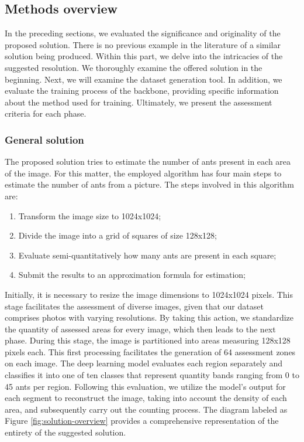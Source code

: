\subsection{{Methods overview}}

In the preceding sections, we evaluated the significance and originality of the proposed solution. There is no previous example in the literature of a similar solution being produced. Within this part, we delve into the intricacies of the suggested resolution. We thoroughly examine the offered solution in the beginning. Next, we will examine the dataset generation tool. In addition, we evaluate the training process of the backbone, providing specific information about the method used for training. Ultimately, we present the assessment criteria for each phase.

\subsubsection{General solution}

The proposed solution tries to estimate the number of ants present in each area of the image. For this matter, the employed algorithm has four main steps to estimate the number of ants from a picture. The steps involved in this algorithm are:

\begin{enumerate}
    \item Transform the image size to 1024x1024;
    \item Divide the image into a grid of squares of size 128x128;
    \item Evaluate semi-quantitatively how many ants are present in each square;
    \item Submit the results to an approximation formula for estimation;
\end{enumerate}

Initially, it is necessary to resize the image dimensions to 1024x1024 pixels. This stage facilitates the assessment of diverse images, given that our dataset comprises photos with varying resolutions. By taking this action, we standardize the quantity of assessed areas for every image, which then leads to the next phase. During this stage, the image is partitioned into areas measuring 128x128 pixels each. This first processing facilitates the generation of 64 assessment zones on each image. The deep learning model evaluates each region separately and classifies it into one of ten classes that represent quantity bands ranging from 0 to 45 ants per region. Following this evaluation, we utilize the model's output for each segment to reconstruct the image, taking into account the density of each area, and subsequently carry out the counting process. The diagram labeled as Figure \ref{fig:solution-overview} provides a comprehensive representation of the entirety of the suggested solution.

